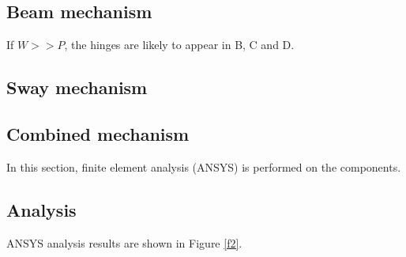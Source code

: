 \subsection*{Beam mechanism}
If $W>>P$, the hinges are likely to appear in B, C and D.

\subsection*{Sway mechanism}

\subsection*{Combined mechanism}






















\iffalse

In this section, finite element analysis (ANSYS) is performed on the components.

\subsection*{Analysis}

ANSYS analysis results are shown in Figure \ref{f2}.

